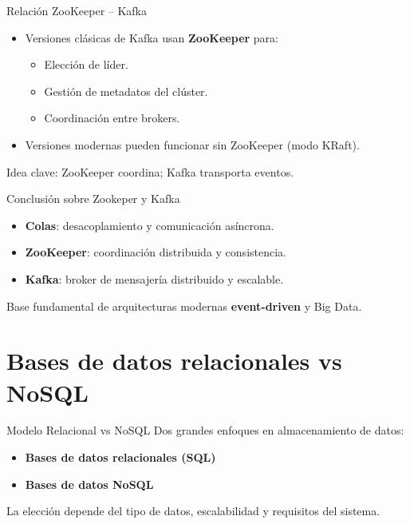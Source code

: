 \documentclass{beamer}
\begin{document}
\begin{frame}{Relación ZooKeeper -- Kafka}
\begin{itemize}
    \item Versiones clásicas de Kafka usan \textbf{ZooKeeper} para:
    \begin{itemize}
        \item Elección de líder.
        \item Gestión de metadatos del clúster.
        \item Coordinación entre brokers.
    \end{itemize}
    \item Versiones modernas pueden funcionar sin ZooKeeper (modo KRaft).
\end{itemize}

\medskip
Idea clave: ZooKeeper coordina; Kafka transporta eventos.
\end{frame}

\begin{frame}{Conclusión sobre Zookeper y Kafka}
\begin{itemize}
    \item \textbf{Colas}: desacoplamiento y comunicación asíncrona.
    \item \textbf{ZooKeeper}: coordinación distribuida y consistencia.
    \item \textbf{Kafka}: broker de mensajería distribuido y escalable.
\end{itemize}

Base fundamental de arquitecturas modernas \textbf{event-driven} y Big Data.
\end{frame}

\section{Bases de datos relacionales vs NoSQL}

\begin{frame}{Modelo Relacional vs NoSQL}
Dos grandes enfoques en almacenamiento de datos:

\begin{itemize}
    \item \textbf{Bases de datos relacionales (SQL)}
    \item \textbf{Bases de datos NoSQL}
\end{itemize}

La elección depende del tipo de datos, escalabilidad y requisitos del sistema.
\end{frame}
\end{document}
